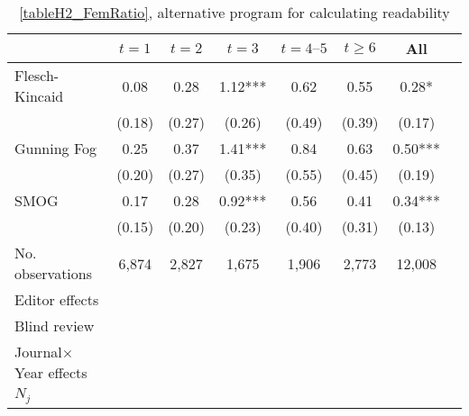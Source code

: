 \begin{table}
    \footnotesize
    \centering
    \begin{threeparttable}
        \caption{\autoref{tableH2_FemRatio}, alternative program for calculating readability}
        \label{tableH2_R}
        \begin{tabular}{p{3cm}S@{}S@{}S@{}S@{}S@{}S@{}S@{}}
            \toprule
            &{\(t=1\)}&{\(t=2\)}&{\(t=3\)}&{\(t=4\text{--}5\)}&{\(t\ge6\)}&{All}\\
            \midrule
            Flesch-Kincaid                &        0.08   &        0.28   &        1.12***&        0.62   &        0.55   &        0.28*  \\
                                          &      (0.18)   &      (0.27)   &      (0.26)   &      (0.49)   &      (0.39)   &      (0.17)   \\
            Gunning Fog                   &        0.25   &        0.37   &        1.41***&        0.84   &        0.63   &        0.50***\\
                                          &      (0.20)   &      (0.27)   &      (0.35)   &      (0.55)   &      (0.45)   &      (0.19)   \\
            SMOG                          &        0.17   &        0.28   &        0.92***&        0.56   &        0.41   &        0.34***\\
                                          &      (0.15)   &      (0.20)   &      (0.23)   &      (0.40)   &      (0.31)   &      (0.13)   \\
            \midrule
            No. observations              &       6,874   &       2,827   &       1,675   &       1,906   &       2,773   &      12,008   \\
            \midrule
            Editor effects       &           {}   &           {}   &           {}   &           {}   &           {}   &           {}   \\
            Blind review                  &           {}   &           {}   &           {}   &           {}   &           {}   &           {}   \\
            Journal\(\times\)Year effects          &           {}   &           {}   &           {}   &           {}   &           {}   &           {}   \\
            \(N_j\)                       &           {}   &           {}   &           {}   &           {}   &           {}   &           {}   \\

\end{tabular}
\end{threeparttable}
\end{table}
